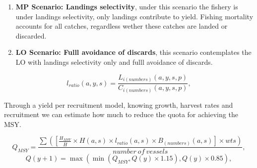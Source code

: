 \documentclass[12pt,oneline,a4paper,numbib]{ouparticle}
\numberwithin{equation}{subsection} %
\begin{document}
\begin{enumerate}

\item
\textbf{MP Scenario: Landings selectivity},  under this scenario the fishery is under landings selectivity, only landings contribute to yield. Fishing mortality accounts for all catches, regardless wether these catches are landed or discarded.

\item
\textbf{LO Scenario: Fulll avoidance of discards}, this scenario contemplates the LO with landings selectivity only and fulll avoidance of discards.


\end{enumerate}

 
\begin{equation}
 l_{ratio} (a, y, s) = \frac
                {L_{i (numbers)}(a, y, s, p)}
                {C_{i (numbers)}(a, y, s, p)},
\end{equation}

Through a yield per recruitment model, knowing growth, harvest rates and recruitment we can estimate how much to reduce the quota for achieving the MSY. 

\begin{equation}
 Q_{MSY} = \frac
                {\sum( [\frac{H_{MSY}}{\bar{H}} \times H (a, s) \times l_{ratio} (a, s) \times B_{(numbers)}(a, s)] \times wts) }
                {number\  of\  vessels}, 
\end{equation}
\begin{equation}
 Q (y+1) = \max( \min(Q_{MSY}, Q(y) \times 1.15), Q(y) \times 0.85), 
\end{equation}




        
        
\end{document}
